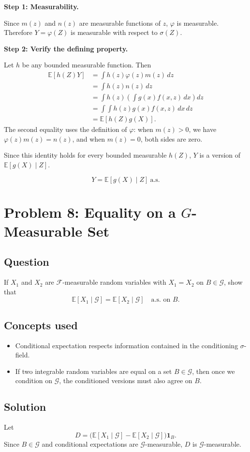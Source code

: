 \documentclass[11pt,a4paper]{article}
\newcommand{\E}{\mathbb{E}}
\newcommand{\1}{\mathbf{1}}
\newcommand{\cG}{\mathcal{G}}
\begin{document}
\textbf{Step 1: Measurability.}

Since $m(z)$ and $n(z)$ are measurable functions of $z$, $\varphi$ is measurable. Therefore $Y=\varphi(Z)$ is measurable with respect to $\sigma(Z)$.

\textbf{Step 2: Verify the defining property.}

Let $h$ be any bounded measurable function. Then
\begin{align*}
\E[h(Z)Y]
&=\int h(z)\varphi(z)m(z)\,dz\\
&=\int h(z)n(z)\,dz\\
&=\int h(z)\left(\int g(x)f(x,z)\,dx\right)dz\\
&=\int\!\!\int h(z)g(x)f(x,z)\,dx\,dz\\
&=\E[h(Z)g(X)].
\end{align*}
The second equality uses the definition of $\varphi$: when $m(z)>0$, we have $\varphi(z)m(z)=n(z)$, and when $m(z)=0$, both sides are zero.

Since this identity holds for every bounded measurable $h(Z)$, $Y$ is a version of $\E[g(X)\mid Z]$.

\[
\boxed{Y=\E[g(X)\mid Z]\ \text{a.s.}}
\]

\section{Problem 8: Equality on a \texorpdfstring{$G$}{G}-Measurable Set}
\subsection*{Question}
If $X_1$ and $X_2$ are $\mathcal{F}$-measurable random variables with $X_1=X_2$ on $B\in \mathcal{G}$, show that
\[
\E[X_1\mid \mathcal{G}]=\E[X_2\mid \mathcal{G}]
\quad \text{a.s. on }B.
\]

\subsection*{Concepts used}
\begin{itemize}
  \item Conditional expectation respects information contained in the conditioning $\sigma$-field.
  \item If two integrable random variables are equal on a set $B\in \cG$, then once we condition on $\cG$, the conditioned versions must also agree on $B$.
\end{itemize}

\subsection*{Solution}
Let
\[
D=\bigl(\E[X_1\mid \cG]-\E[X_2\mid \cG]\bigr)\1_B.
\]
Since $B\in \cG$ and conditional expectations are $\cG$-measurable, $D$ is $\cG$-measurable.
\end{document}
